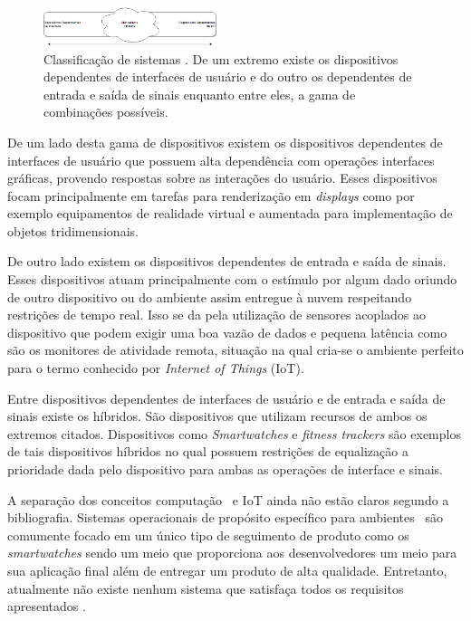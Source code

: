 		\begin{figure}[h] \centering
			\vspace{-10pt}
			\includegraphics[width=0.45\textwidth]{img/rt-gradiente.png}
			\vspace{-10pt}
			\caption{Classificação de sistemas \wearables. De um extremo existe os dispositivos dependentes de interfaces de usuário e do outro os dependentes de entrada e saída de sinais enquanto entre eles, a gama de combinações possíveis.}
			\label{fig:classification}
		\end{figure}

		De um lado desta gama de dispositivos existem os dispositivos dependentes de interfaces de usuário que possuem alta dependência com operações interfaces gráficas, provendo respostas sobre as interações do usuário.
        Esses dispositivos focam principalmente em tarefas para renderização em \textit{displays} como por exemplo equipamentos de realidade virtual e aumentada para implementação de objetos tridimensionais.

		De outro lado existem os dispositivos dependentes de entrada e saída de sinais. Esses dispositivos atuam principalmente com o estímulo por algum dado oriundo de outro dispositivo ou do ambiente assim entregue à nuvem respeitando restrições de tempo real.
        Isso se da pela utilização de sensores acoplados ao dispositivo que podem exigir uma boa vazão de dados e pequena latência como são os monitores de atividade remota, situação na qual cria-se o ambiente perfeito para o termo conhecido por \textit{Internet of Things} (IoT).

		Entre dispositivos dependentes de interfaces de usuário e de entrada e saída de sinais existe os híbridos. São dispositivos que utilizam recursos de ambos os extremos citados.
        Dispositivos como \textit{Smartwatches} e \textit{fitness trackers} são exemplos de tais dispositivos híbridos no qual possuem restrições de equalização a prioridade dada pelo dispositivo para ambas as operações de interface e sinais.

		A separação dos conceitos computação \wearable\ e IoT ainda não estão claros segundo a bibliografia. Sistemas operacionais de propósito específico para ambientes \wearable\ são comumente focado em um único tipo de seguimento de produto como os \textit{smartwatches} sendo um meio que proporciona aos desenvolvedores um meio para sua aplicação final além de entregar um produto de alta qualidade.
        Entretanto, atualmente não existe nenhum sistema que satisfaça todos os requisitos apresentados \cite{Amorim2017}.

